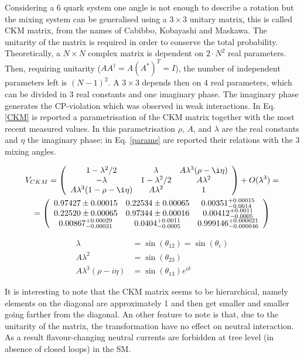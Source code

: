 Considering a 6 quark system one angle is not enough to describe a rotation but the mixing system can be generalised
using a $3 \times 3$ unitary matrix, this is called CKM matrix, from the names of Cabibbo, Kobayashi and Maskawa.
The unitarity of the matrix is required in order to conserve the total probability. Theoretically, a $N \times N$ complex
matrix is dependent on $2 \cdot N^2$ real parameters. Then, requiring unitarity ($AA^\dagger = A(A^*)^T = I$),
the number of independent parameters left is $(N - 1)^2$. A $3 \times 3$ depends then on 4 real parameters, which
can be divided in 3 real constants and one imaginary phase. The imaginary phase generates the CP-violation which was
observed in weak interactions. In Eq. \ref{CKM} is reported a parametrisation of the CKM matrix together with the most
recent measured values\cite{PDG2012}. In this parametrisation $\rho$, $A$, and $\lambda$ are the real constants and $\eta$
the imaginary phase; in Eq. \ref{params} are reported their relations with the 3 mixing angles.

\begin{multline}
\label{CKM}
V_{CKM} = \left( \begin{array}{ccc}
1 - \lambda^2/2 & \lambda  & A \lambda^3(\rho -\i\eta) \\
-\lambda & 1 - \lambda^2/2 & A\lambda^2 \\
A \lambda^3(1 - \rho -\i\eta) & A\lambda^2 & 1 
\end{array} \right) + O(\lambda^3)= \\
= \left( \begin{array}{ccc}
0.97427 \pm 0.00015 & 0.22534 \pm 0.00065 & 0.00351^{+0.00015}_{-0.0014} \\
 0.22520 \pm 0.00065 & 0.97344 \pm 0.00016 & 0.00412^{+0.0011}_{-0.0005} \\
 0.00867^{+0.00029}_{-0.00031} & 0.0404^{+0.0011}_{-0.0005} & 0.999146^{+0.000021}_{-0.000046} \\
\end{array} \right)
\end{multline}

\begin{align}
\label{params}
\lambda & = \sin(\theta_{12}) = \sin(\theta_c) \\
A\lambda^2 & = \sin(\theta_{23}) \\
A\lambda^3(\rho - i\eta) & = \sin(\theta_{13})e^{i\delta}
\end{align}

It is interesting to note that the CKM matrix seems to be hierarchical, namely elements on the diagonal are approximately
1 and then get smaller and smaller going farther from the diagonal.
An other feature to note is that, due to the unitarity of the matrix, the transformation have no effect on neutral interaction.
As a result flavour-changing neutral currents are forbidden at tree level (in absence of closed loops) in the SM.

